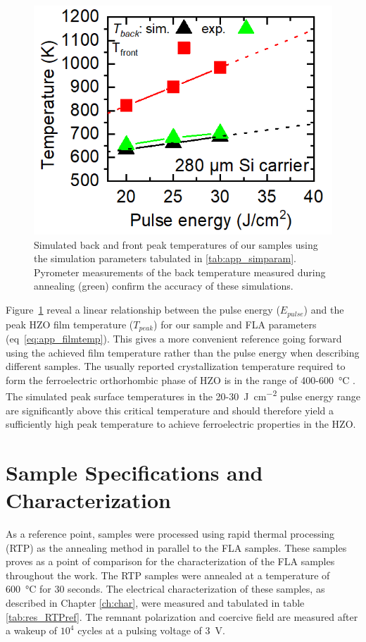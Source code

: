 \documentclass[11pt,twoside]{eitExjobb}
\begin{document}
\begin{figure}[htbp]
    \centering
    \includegraphics[width=.41\linewidth]{fig/COMSOLFlashInt.png}
    \caption{Simulated back and front peak temperatures of our samples using the
    simulation parameters tabulated in \ref{tab:app_simparam}. Pyrometer
    measurements of the back temperature measured during annealing (green) confirm
    the accuracy of these simulations.}\label{fig:res_Comsol}
\end{figure}

Figure~\ref{fig:res_Comsol} reveal a linear relationship between the pulse
energy ($E_{pulse}$) and the peak HZO film temperature ($T_{peak}$) for our
sample and FLA parameters (eq~\ref{eq:app_filmtemp}). This gives a more
convenient reference going forward using the achieved film temperature rather
than the pulse energy when describing different samples. The usually reported
crystallization temperature required to form the ferroelectric orthorhombic
phase of HZO is in the range of 400-\SI{600}{\celsius}
\cite{muller2012ferroelectricity, athle2022improved}.
The simulated peak surface temperatures in the
20-\SI{30}{\joule\per\square\centi\meter} pulse energy range are significantly
above this critical temperature and should therefore yield a sufficiently high
peak temperature to achieve ferroelectric properties in the HZO.

\section{Sample Specifications and Characterization}
As a reference point, samples were processed using rapid thermal processing
(RTP) as the annealing method in parallel to the FLA samples. These samples
proves as a point of comparison for the characterization of the FLA samples
throughout the work. The RTP samples were annealed at a temperature of
\SI{600}{\celsius} for 30 seconds. The electrical characterization of these
samples, as described in Chapter \ref{ch:char}, were measured and
tabulated in table \ref{tab:res_RTPref}. The remnant polarization and coercive
field are measured after a wakeup of $10^4$ cycles at a pulsing voltage of
\SI{3}{\volt}.
\end{document}
